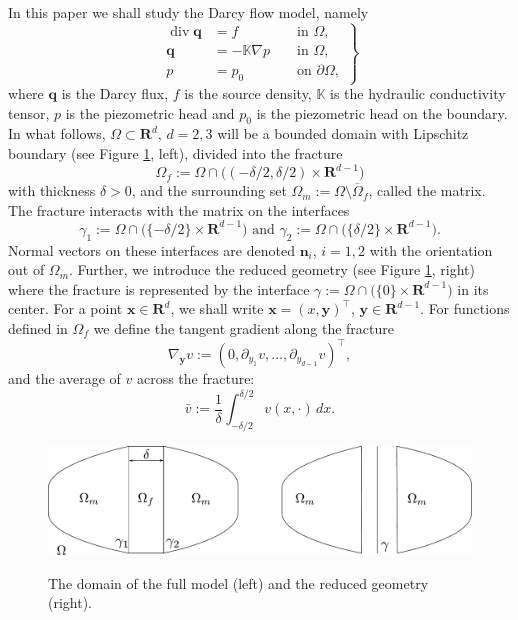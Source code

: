 \documentclass{llncs}
\def\vc#1{\mathbf{\boldsymbol{#1}}}     %
\def\tn#1{{\mathbb{#1}}}    %
\def\div{\operatorname{div}}
\def\grad{\nabla}
\def\Real{{\mathbf R}}
\def\yy{{\vc y}}
\begin{document}
In this paper we shall study the Darcy flow model, namely
\begin{equation}
\label{eq:darcy_flow}
\left.
\begin{aligned}
    \div \vc q &= f &&\mbox{ in }\Omega, \\
    \vc q &= -\tn K \grad p &&\mbox{ in }\Omega,\\
    p &= p_0 &&\mbox{ on }\partial\Omega,
\end{aligned}
\right\}
\end{equation}
where $\vc q$ is the Darcy flux, $f$ is the source density, $\tn K$ is the hydraulic conductivity tensor, $p$ is the piezometric head and $p_0$ is 
the piezometric head on the boundary.
In what follows, $\Omega \subset \Real^d$, $d=2,3$ will be a bounded domain with Lipschitz boundary (see Figure \ref{fig:omegas}, left), divided into the fracture
\[ \Omega_f:=\Omega\cap \big((-\delta/2,\delta/2)\times\Real^{d-1}\big) \]
with thickness $\delta>0$, and the surrounding set $\Omega_m:=\Omega\setminus\overline\Omega_f$, called the matrix.
The fracture interacts with the matrix on the interfaces 
\[ \gamma_1:=\Omega\cap\big( \{-\delta/2\}\times \Real^{d-1}\big) \mbox{ and }\gamma_2:=\Omega\cap\big( \{ \delta/2\}\times \Real^{d-1}\big). \]
Normal vectors on these interfaces are denoted $\vc n_i$, $i=1,2$ with the orientation out of $\Omega_m$.
Further, we introduce the reduced geometry (see Figure \ref{fig:omegas}, right)
where the fracture is represented by the interface $\gamma:=\Omega\cap\big(\{0\}\times\Real^{d-1}\big)$ in its center.
For a  point $\vc x\in\Real^d$, we shall write $\vc x=(x,\yy)^\top$, $\yy\in\Real^{d-1}$.
For functions defined in $\Omega_f$ we define the tangent gradient along the fracture
\[ \nabla_\yy v:=(0,\partial_{y_1} v,\ldots,\partial_{y_{d-1}} v)^\top, \]
and the average of $v$ across the fracture:
\[ \bar v:=\frac1\delta\int_{-\delta/2}^{\delta/2} v(x,\cdot)\,dx. \]
\begin{figure}[h]
\centering
\includegraphics[width=12cm]{figures/full_model_domain}
\label{fig:omegas}
\caption{The domain of the full model (left) and the reduced geometry (right).}
\end{figure}
\end{document}
